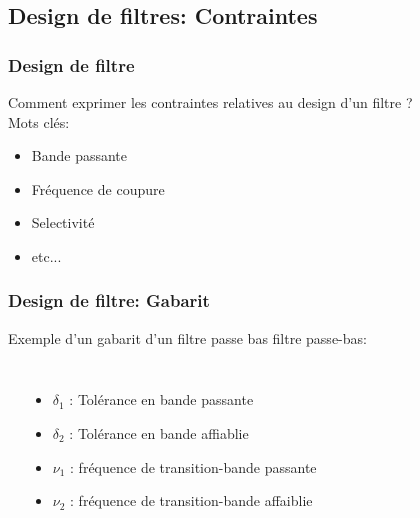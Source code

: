\documentclass{beamer}
\begin{document}
\subsection{Design de filtres: Contraintes}
\begin{frame}
\frametitle{Design de filtre}
Comment exprimer les contraintes relatives au design d'un filtre ?\\
\vspace{1cm}
Mots clés:
\begin{itemize}
\item<2->  Bande passante 
\vspace{0.3cm}
\item<3-> Fréquence de coupure
\vspace{0.3cm} 
\item<4->  Selectivité
\vspace{0.3cm}
\item<5-> etc...
\end{itemize}
\vspace{1cm}

\end{frame}

\begin{frame}
\frametitle{Design de filtre: Gabarit}
Exemple d'un gabarit d'un filtre passe bas filtre passe-bas:\\
\vspace{0.5cm} 
\begin{columns}
\column{60mm}
\begin{center}
\end{center}

\column{60mm}
\begin{itemize}
\item<2-> $\delta_1$ : Tolérance en bande passante 
\vspace{0.2cm}
\item<3->$\delta_2$ : Tolérance en bande affiablie  
\vspace{0.2cm}
\item<4-> $\nu_1$ : fréquence de transition-bande passante 
\vspace{0.2cm}
\item<5-> $\nu_2$ : fréquence de transition-bande affaiblie 
\end{itemize}

\end{columns}
\end{frame}
\end{document}
